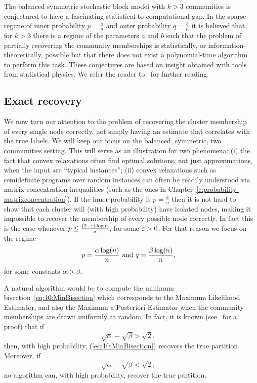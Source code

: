 \begin{remark}
The balanced symmetric stochastic block model with $k>3$ communities is conjectured to have a fascinating statistical-to-computational gap. In the sparse regime of inner probability $p=\frac{a}{n}$ and outer probability $q = \frac{b}{n}$ it is believed that, for $k>3$ there is a regime of the parameters $a$ and $b$ such that the problem of partially recovering the community memberships is statistically, or information-theoretically, possible but that there does not exist a polynomial-time algorithm to perform this task. These conjectures are based on insight obtained with tools from statistical physics. We refer the reader to~\cite{Decelle_SBM,Zhang_Moore_2014,Ghasemian_Moore_SBM_2015,Abbe_Sandon_KSbound} for further reading.
\end{remark}



\subsection{Exact recovery}



We now turn our attention to the problem of recovering the cluster membership of every single node correctly, not simply having an estimate that correlates with the true labels. We will keep our focus on the balanced, symmetric, two communities setting. This will serve as an illustration for two phenomena: (i) the fact that convex relaxations often find optimal solutions, not just approximations, when the input are ``typical instances''; (ii) convex relaxations such as semidefinite programs over random instances can often be readily understood via matrix concentration inequalities (such as the ones in Chapter~\ref{c:probability-matrixconcentration}). If the inner-probability is $p = \frac{a}n$ then it is not hard to show that each cluster will (with high probability) have isolated nodes, making it impossible to recover the membership of every possible node correctly. In fact this is the case whenever $p \leq  \frac{(2-\varepsilon)\log n}n$, for some $\varepsilon>0$. For that reason we focus on the regime
\begin{equation}
p = \frac{\alpha\log(n)}{n} \text{ and } q = \frac{\beta\log(n)}{n},
\end{equation}
for some constants $\alpha>\beta$.

A natural algorithm would be to compute the minimum bisection~\eqref{eq:10:MinBisection} which corresponds to the Maximum Likelihood Estimator, and also the Maximum a Posteriori Estimator when the community memberships are drawn uniformly at random. In fact, it is known (see~\cite{Abbe_SBMExact} for a proof) that if
\begin{equation}\label{condition_MLE}
\sqrt{\alpha} - \sqrt{\beta}  > \sqrt{2},
\end{equation}
then, with high probability, (\ref{eq:10:MinBisection}) recovers the true partition. Moreover, if
\[
\sqrt{\alpha} - \sqrt{\beta}  < \sqrt{2},
\]
no algorithm can, with high probability, recover the true partition.

